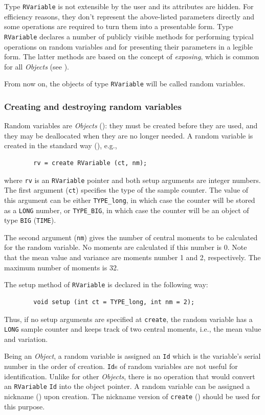 Type {\tt RVariable} is not extensible by the user and its
attributes are hidden.
For efficiency reasons, they don't represent the above-listed parameters
directly and some operations are required to turn them into a presentable
form.
Type {\tt RVariable} declares a number of publicly visible methods
for performing typical operations on random variables and for presenting
their parameters in a legible form.
The latter methods are based on the concept of {\em exposing}, which is
common for all {\em Objects\/} (see ).

From now on, the objects of type {\tt RVariable} will be called random
variables.

\subsubsection{Creating and destroying random variables}
\label{rm_pm_rv_cr}

Random variables are {\em Objects\/} (): they must be created
before they
are used, and they may be deallocated when they are no longer needed.
A random variable is created in the standard way (), e.g.,
\begin{verbatim}
        rv = create RVariable (ct, nm);
\end{verbatim}
where {\tt rv} is an {\tt RVariable} pointer and both setup
arguments are integer numbers.
The first argument ({\tt ct}) specifies the type of the sample counter.
The value of this argument can be either {\tt TYPE\_long}, in which case
the counter will be stored as a {\tt LONG} number, or {\tt TYPE\_BIG},
in which case the counter will be an object of type {\tt BIG} ({\tt TIME}).

The second argument ({\tt nm}) gives the
number of central moments to be calculated for the random variable.
No moments are calculated if this number is 0.
Note that the mean value and variance are
moments number 1 and 2, respectively.
The maximum number of moments is 32.

The setup method of {\tt RVariable} is declared in the following way:
\begin{verbatim}
        void setup (int ct = TYPE_long, int nm = 2);
\end{verbatim}
Thus, if no setup arguments are specified at {\tt create}, the random
variable has a {\tt LONG} sample counter and keeps track of two
central moments, i.e., the mean value and variation.

Being an {\em Object}, a random variable is assigned an {\tt Id} which
is the variable's serial number in the order of creation.
{\tt Id}s of random variables are not useful for identification.
Unlike for other {\em Objects}, there is no operation that would convert
an {\tt RVariable} {\tt Id} into the object pointer.
A random variable can be assigned a nickname () upon
creation.
The nickname version of {\tt create} () should be used for
this purpose.

